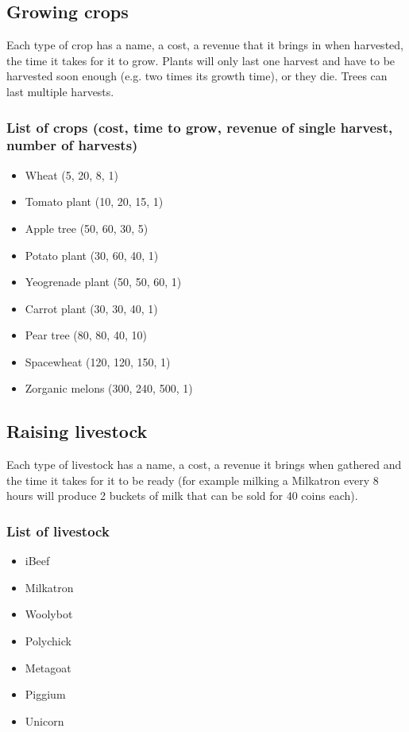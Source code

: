 \documentclass[a4paper,11pt,notitlepage]{report}
\begin{document}
\subsection{Growing crops}
Each type of crop has a name, a cost, a revenue that it brings in when harvested, the time it takes for it to grow. Plants will only last one harvest and have to be harvested soon enough (e.g. two times its growth time), or they die. Trees can last multiple harvests.
\subsubsection{List of crops (cost, time to grow, revenue of single harvest, number of harvests)}
\begin{itemize}
\item Wheat (5, 20, 8, 1)
\item Tomato plant (10, 20, 15, 1)
\item Apple tree (50, 60, 30, 5)
\item Potato plant (30, 60, 40, 1)
\item Yeogrenade plant (50, 50, 60, 1)
\item Carrot plant (30, 30, 40, 1)
\item Pear tree (80, 80, 40, 10)
\item Spacewheat (120, 120, 150, 1)
\item Zorganic melons (300, 240, 500, 1)
\end{itemize}

\subsection{Raising livestock}
Each type of livestock has a name, a cost, a revenue it brings when gathered and the time it takes for it to be ready (for example milking a Milkatron every 8 hours will produce 2 buckets of milk that can be sold for 40 coins each).

\subsubsection{List of livestock}
\begin{itemize}
\item iBeef
\item Milkatron
\item Woolybot
\item Polychick
\item Metagoat
\item Piggium
\item Unicorn
\end{itemize}
\end{document}
